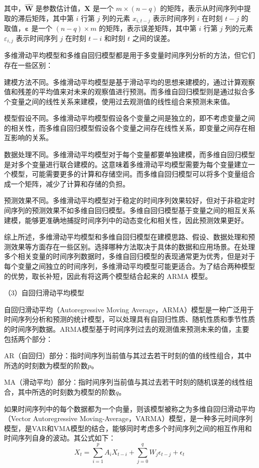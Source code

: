 \documentclass[master]{thesis-uestc}
\begin{document}
其中，$\hat{\boldsymbol{W}}$ 是参数估计值，$\boldsymbol{X}$ 是一个 $m \times (n-q)$ 的矩阵，表示从时间序列中提取的滞后矩阵，其中第 $i$ 行第 $j$ 列的元素 $x_{i,t-j}$ 表示时间序列 $i$ 在时刻 $t-j$ 的取值，$\boldsymbol{\varepsilon}$ 是一个 $(n-q) \times m$ 的矩阵，表示误差矩阵，其中第 $i$ 行第 $j$ 列的元素 $\varepsilon_{i,j}$ 表示时间序列 $j$ 在时刻 $t-i$ 和时刻 $t$ 之间的误差。

多维滑动平均模型和多维自回归模型都是用于多变量时间序列分析的方法，但它们存在一些区别：

建模方法不同。多维滑动平均模型是基于滑动平均的思想来建模的，通过计算观察值和残差的平均值来对未来的观察值进行预测。而多维自回归模型则是通过拟合多个变量之间的线性关系来建模，使用过去观测值的线性组合来预测未来值。

模型假设不同。多维滑动平均模型假设各个变量之间是独立的，即不考虑变量之间的相关性，而多维自回归模型假设各个变量之间存在线性关系，即变量之间存在相互影响的关系。

数据处理不同。多维滑动平均模型对于每个变量都要单独建模，而多维自回归模型是对多个变量进行联合建模的。这意味着多维滑动平均模型需要为每个变量建立一个模型，可能需要更多的计算和存储空间。而多维自回归模型可以将多个变量组合成一个矩阵，减少了计算和存储的负担。

预测效果不同。多维滑动平均模型对于稳定的时间序列效果较好，但对于非稳定时间序列的预测效果不如多维自回归模型。多维自回归模型基于变量之间的相互关系建模，能够更准确地捕捉时间序列中的动态变化和相关性，因此预测效果更好。

综上所述，多维滑动平均模型和多维自回归模型在建模思路、假设、数据处理和预测效果等方面存在一些区别。选择哪种方法取决于具体的数据和应用场景。在处理多个相关变量的时间序列数据时，多维自回归模型的表现通常更为优秀，但是对于每个变量之间独立的时间序列，多维滑动平均模型可能更适合。为了结合两种模型的优势，取长补短，因此有将这两个模型结合起来的 ARMA 模型。

（3）自回归滑动平均模型

自回归滑动平均（Autoregressive Moving Average，ARMA）模型是一种广泛用于时间序列分析和预测的统计模型，可以处理具有自回归性质、随机性质和季节性质的时间序列数据。ARMA模型基于时间序列过去的观测值来预测未来的值，主要包括两个部分：

AR（自回归）部分：指时间序列当前值与其过去若干时刻的值的线性组合，其中所选的时刻数为模型的阶数$p$。

MA（滑动平均）部分：指时间序列当前值与其过去若干时刻的随机误差的线性组合，其中所选的时刻数为模型的阶数$q$。

如果时间序列中的每个数据都为一个向量，则该模型被称之为多维自回归滑动平均 （Vector Autoregressive Moving-Average，VARMA）模型，是一种多元时间序列模型，是VAR和VMA模型的结合，能够同时考虑多个时间序列之间的相互作用和时间序列自身的波动。其公式如下：
\begin{equation}
    X_t = \sum_{i=1}^{p}A_iX_{t-i} + \sum_{j=0}^{q}W_j\epsilon_{t-j}+\epsilon_t
\end{equation}
\end{document}
